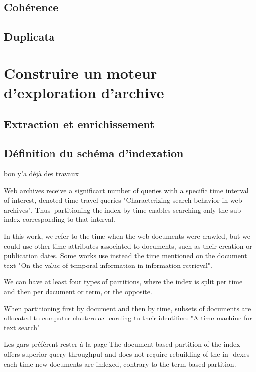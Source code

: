 \documentclass[symmetric,justified,marginals=raggedouter]{tufte-book}
\begin{document}
\subsection{Cohérence}

\subsection{Duplicata}

\section{Construire un moteur d'exploration d'archive}
\label{sec:4_moteur}

\subsection{Extraction et enrichissement}

\subsection{Définition du schéma d'indexation}

bon y'a déjà des travaux 

Web archives receive a significant number of queries with a
specific time interval of interest, denoted time-travel queries
"Characterizing search
behavior in web archives".  Thus, partitioning the index by time enables searching
only the sub-index corresponding to that interval.

In this
work,  we  refer  to  the  time  when  the  web  documents  were
crawled, but we could use other time attributes associated
to  documents,  such  as  their  creation  or  publication  dates.
Some works use instead the time mentioned on the document
text "On the
value of temporal information in information retrieval".

We can have at least four types of partitions, where the
index is split per time and then per document or term, or the
opposite.

When  partitioning  first  by  document  and  then  by  time,
subsets of documents are allocated to computer clusters ac-
cording to their identifiers "A time machine for text search"

Les gars préfèrent rester à la page 
The document-based partition of the index offers superior
query throughput and does not require rebuilding of the in-
dexes  each  time  new  documents  are  indexed,  contrary  to
the term-based partition. 
\end{document}
